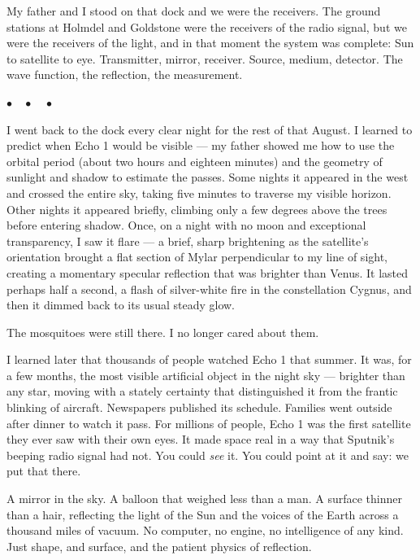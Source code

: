 \documentclass[12pt, letterpaper]{article}
\begin{document}
My father and I stood on that dock and we were the receivers. The ground stations at Holmdel and Goldstone were the receivers of the radio signal, but we were the receivers of the light, and in that moment the system was complete: Sun to satellite to eye. Transmitter, mirror, receiver. Source, medium, detector. The wave function, the reflection, the measurement.

\begin{center}
$\bullet\quad\bullet\quad\bullet$
\end{center}

I went back to the dock every clear night for the rest of that August. I learned to predict when Echo 1 would be visible --- my father showed me how to use the orbital period (about two hours and eighteen minutes) and the geometry of sunlight and shadow to estimate the passes. Some nights it appeared in the west and crossed the entire sky, taking five minutes to traverse my visible horizon. Other nights it appeared briefly, climbing only a few degrees above the trees before entering shadow. Once, on a night with no moon and exceptional transparency, I saw it flare --- a brief, sharp brightening as the satellite's orientation brought a flat section of Mylar perpendicular to my line of sight, creating a momentary specular reflection that was brighter than Venus. It lasted perhaps half a second, a flash of silver-white fire in the constellation Cygnus, and then it dimmed back to its usual steady glow.

The mosquitoes were still there. I no longer cared about them.

I learned later that thousands of people watched Echo 1 that summer. It was, for a few months, the most visible artificial object in the night sky --- brighter than any star, moving with a stately certainty that distinguished it from the frantic blinking of aircraft. Newspapers published its schedule. Families went outside after dinner to watch it pass. For millions of people, Echo 1 was the first satellite they ever saw with their own eyes. It made space real in a way that Sputnik's beeping radio signal had not. You could \emph{see} it. You could point at it and say: we put that there.

A mirror in the sky. A balloon that weighed less than a man. A surface thinner than a hair, reflecting the light of the Sun and the voices of the Earth across a thousand miles of vacuum. No computer, no engine, no intelligence of any kind. Just shape, and surface, and the patient physics of reflection.
\end{document}
